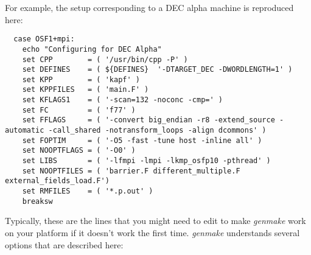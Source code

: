 For example, the setup corresponding to a DEC alpha machine is reproduced
here:
\begin{verbatim}
  case OSF1+mpi:
    echo "Configuring for DEC Alpha"
    set CPP        = ( '/usr/bin/cpp -P' )
    set DEFINES    = ( ${DEFINES}  '-DTARGET_DEC -DWORDLENGTH=1' )
    set KPP        = ( 'kapf' )
    set KPPFILES   = ( 'main.F' )
    set KFLAGS1    = ( '-scan=132 -noconc -cmp=' )
    set FC         = ( 'f77' )
    set FFLAGS     = ( '-convert big_endian -r8 -extend_source -automatic -call_shared -notransform_loops -align dcommons' )
    set FOPTIM     = ( '-O5 -fast -tune host -inline all' )
    set NOOPTFLAGS = ( '-O0' )
    set LIBS       = ( '-lfmpi -lmpi -lkmp_osfp10 -pthread' )
    set NOOPTFILES = ( 'barrier.F different_multiple.F external_fields_load.F')
    set RMFILES    = ( '*.p.out' )
    breaksw
\end{verbatim}

Typically, these are the lines that you might need to edit to make \textit{%
genmake} work on your platform if it doesn't work the first time. \textit{%
genmake} understands several options that are described here:


